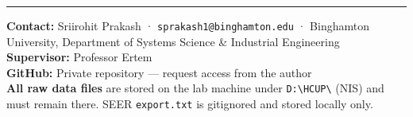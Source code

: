 \documentclass[11pt,letterpaper]{article}
\begin{document}
\vspace{1cm}
\noindent\rule{\linewidth}{0.5pt}
\small
\noindent \textbf{Contact:} Sriirohit Prakash · \texttt{sprakash1@binghamton.edu} ·
Binghamton University, Department of Systems Science \& Industrial Engineering\\
\textbf{Supervisor:} Professor Ertem\\
\textbf{GitHub:} Private repository — request access from the author\\
\textbf{All raw data files} are stored on the lab machine under \texttt{D:\textbackslash HCUP\textbackslash}
(NIS) and must remain there. SEER \texttt{export.txt} is gitignored and stored locally only.
\end{document}
